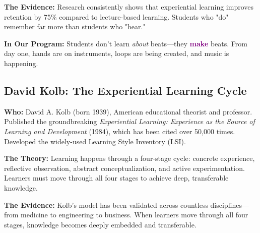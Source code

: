 \documentclass[11pt,letterpaper]{article}
\newcommand{\purple}[1]{\textcolor{purple}{\textbf{#1}}}
\begin{document}
\textbf{The Evidence:} Research consistently shows that experiential learning improves retention by 75\% compared to lecture-based learning. Students who "do" remember far more than students who "hear."

\textbf{In Our Program:} Students don't learn \textit{about} beats—they \purple{make} beats. From day one, hands are on instruments, loops are being created, and music is happening.

\subsection*{David Kolb: The Experiential Learning Cycle}

\textbf{Who:} David A. Kolb (born 1939), American educational theorist and professor. Published the groundbreaking \textit{Experiential Learning: Experience as the Source of Learning and Development} (1984), which has been cited over 50,000 times. Developed the widely-used Learning Style Inventory (LSI).

\textbf{The Theory:} Learning happens through a four-stage cycle: concrete experience, reflective observation, abstract conceptualization, and active experimentation. Learners must move through all four stages to achieve deep, transferable knowledge.

\textbf{The Evidence:} Kolb's model has been validated across countless disciplines—from medicine to engineering to business. When learners move through all four stages, knowledge becomes deeply embedded and transferable.

\begin{center}
\end{center}
\end{document}
